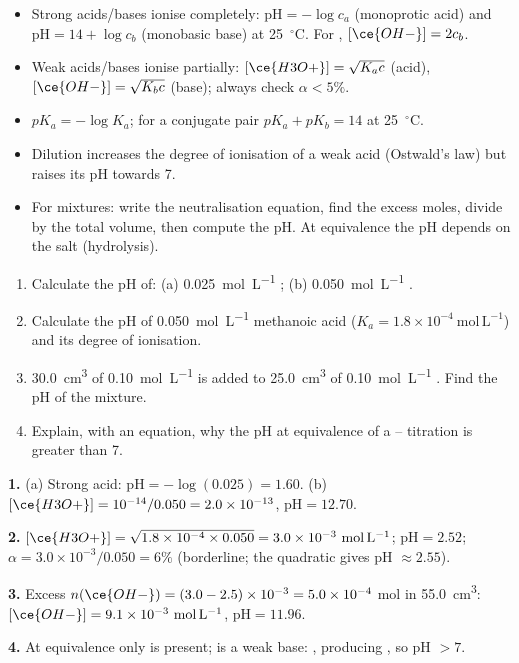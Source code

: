 \documentclass[11pt]{article}
\begin{document}
\begin{aretenir}
\begin{itemize}
\item Strong acids/bases ionise completely: $\mathrm{pH} = -\log c_a$ (monoprotic acid) and $\mathrm{pH} = 14 + \log c_b$ (monobasic base) at \SI{25}{\ensuremath{{}^{\circ}\mathrm{C}}}. For , $[\ce{OH-}] = 2c_b$.
\item Weak acids/bases ionise partially: $[\ce{H3O+}] = \sqrt{K_a c}$ (acid), $[\ce{OH-}] = \sqrt{K_b c}$ (base); always check $\alpha < 5\%$.
\item $pK_a = -\log K_a$; for a conjugate pair $pK_a + pK_b = 14$ at \SI{25}{\ensuremath{{}^{\circ}\mathrm{C}}}.
\item Dilution increases the degree of ionisation of a weak acid (Ostwald's law) but raises its pH towards 7.
\item For mixtures: write the neutralisation equation, find the excess moles, divide by the total volume, then compute the pH. At equivalence the pH depends on the salt (hydrolysis).
\end{itemize}
\end{aretenir}

\begin{exercice}[Practice]
\begin{enumerate}
\item Calculate the pH of: (a) \SI{0.025}{mol.L^{-1}} ; (b) \SI{0.050}{mol.L^{-1}} .
\item Calculate the pH of \SI{0.050}{mol.L^{-1}} methanoic acid  ($K_a = 1.8\times10^{-4}\ \mathrm{mol\,L^{-1}}$) and its degree of ionisation.
\item \SI{30.0}{cm^3} of \SI{0.10}{mol.L^{-1}}  is added to \SI{25.0}{cm^3} of \SI{0.10}{mol.L^{-1}} . Find the pH of the mixture.
\item Explain, with an equation, why the pH at equivalence of a -- titration is greater than 7.
\end{enumerate}
\end{exercice}

\begin{corrige}[Exercise 1]
\textbf{1.} (a) Strong acid: $\mathrm{pH} = -\log(0.025) = 1.60$. (b) $[\ce{H3O+}] = 10^{-14}/0.050 = 2.0\times10^{-13}$, $\mathrm{pH} = 12.70$.

\textbf{2.} $[\ce{H3O+}] = \sqrt{1.8\times10^{-4}\times0.050} = 3.0\times10^{-3}\ \mathrm{mol\,L^{-1}}$; $\mathrm{pH} = 2.52$; $\alpha = 3.0\times10^{-3}/0.050 = 6\%$ (borderline; the quadratic gives pH $\approx 2.55$).

\textbf{3.} Excess $n(\ce{OH-}) = (3.0-2.5)\times10^{-3} = 5.0\times10^{-4}$ mol in \SI{55.0}{cm^3}: $[\ce{OH-}] = 9.1\times10^{-3}\ \mathrm{mol\,L^{-1}}$, $\mathrm{pH} = 11.96$.

\textbf{4.} At equivalence only  is present;  is a weak base: , producing , so pH $> 7$.
\end{corrige}
\end{document}
